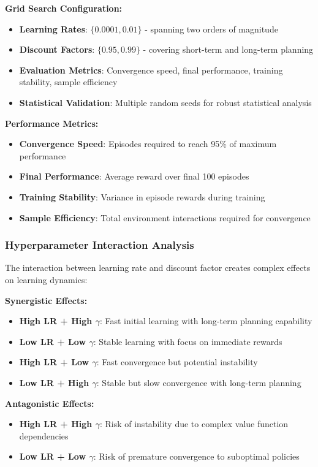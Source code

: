 \documentclass[12pt]{article}
\begin{document}
{{{\textbf{Grid Search Configuration:}
\begin{itemize}
    \item \textbf{Learning Rates}: $\{0.0001, 0.01\}$ - spanning two orders of magnitude
    \item \textbf{Discount Factors}: $\{0.95, 0.99\}$ - covering short-term and long-term planning
    \item \textbf{Evaluation Metrics}: Convergence speed, final performance, training stability, sample efficiency
    \item \textbf{Statistical Validation}: Multiple random seeds for robust statistical analysis
\end{itemize}

\textbf{Performance Metrics:}
\begin{itemize}
    \item \textbf{Convergence Speed}: Episodes required to reach 95\% of maximum performance
    \item \textbf{Final Performance}: Average reward over final 100 episodes
    \item \textbf{Training Stability}: Variance in episode rewards during training
    \item \textbf{Sample Efficiency}: Total environment interactions required for convergence
\end{itemize}

\subsubsection{Hyperparameter Interaction Analysis}

The interaction between learning rate and discount factor creates complex effects on learning dynamics:

\textbf{Synergistic Effects:}
\begin{itemize}
    \item \textbf{High LR + High $\gamma$}: Fast initial learning with long-term planning capability
    \item \textbf{Low LR + Low $\gamma$}: Stable learning with focus on immediate rewards
    \item \textbf{High LR + Low $\gamma$}: Fast convergence but potential instability
    \item \textbf{Low LR + High $\gamma$}: Stable but slow convergence with long-term planning
\end{itemize}

\textbf{Antagonistic Effects:}
\begin{itemize}
    \item \textbf{High LR + High $\gamma$}: Risk of instability due to complex value function dependencies
    \item \textbf{Low LR + Low $\gamma$}: Risk of premature convergence to suboptimal policies
\end{itemize}

}}}
\end{document}
